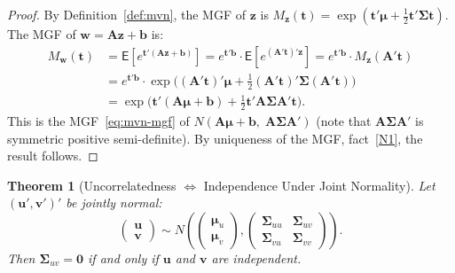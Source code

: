 \documentclass[14pt]{extarticle}
\theoremstyle{plain}
\newtheorem{theorem}{Theorem}[section]
\theoremstyle{definition}
\theoremstyle{remark}
\newcommand\expc{\mathsf{E}}
\newcommand{\bzero}{\mathbf{0}}
\newcommand{\bz}{\mathbf{z}}
\newcommand{\bw}{\mathbf{w}}
\newcommand{\bA}{\mathbf{A}}
\newcommand{\bv}{\mathbf{v}}
\newcommand{\bu}{\mathbf{u}}
\begin{document}
\begin{proof}
By Definition~\ref{def:mvn}, the MGF of $\bz$ is $M_{\bz}(\mathbf{t}) = \exp(\mathbf{t}'\boldsymbol\mu + \frac{1}{2}\mathbf{t}'\boldsymbol\Sigma\mathbf{t})$. The MGF of $\bw = \bA\bz + \mathbf{b}$ is:
\begin{align*}
M_{\bw}(\mathbf{t}) &= \expc\!\left[e^{\mathbf{t}'(\bA\bz + \mathbf{b})}\right] = e^{\mathbf{t}'\mathbf{b}} \cdot \expc\!\left[e^{(\bA'\mathbf{t})' \bz}\right] = e^{\mathbf{t}'\mathbf{b}} \cdot M_{\bz}(\bA'\mathbf{t})\\
&= e^{\mathbf{t}'\mathbf{b}} \cdot \exp\bigl((\bA'\mathbf{t})'\boldsymbol\mu + \tfrac{1}{2}(\bA'\mathbf{t})'\boldsymbol\Sigma(\bA'\mathbf{t})\bigr)\\
&= \exp\bigl(\mathbf{t}'(\bA\boldsymbol\mu + \mathbf{b}) + \tfrac{1}{2}\mathbf{t}'\bA\boldsymbol\Sigma\bA'\mathbf{t}\bigr).
\end{align*}
This is the MGF~\eqref{eq:mvn-mgf} of $N(\bA\boldsymbol\mu + \mathbf{b},\; \bA\boldsymbol\Sigma\bA')$ (note that $\bA\boldsymbol\Sigma\bA'$ is symmetric positive semi-definite). By uniqueness of the MGF, fact~\ref{N1}, the result follows.
\end{proof}

\begin{theorem}[Uncorrelatedness $\Leftrightarrow$ Independence Under Joint Normality]\label{thm:mvn-uncorr-indep}
Let $(\bu', \bv')'$ be jointly normal:
\[
\begin{pmatrix} \bu \\ \bv \end{pmatrix} \sim N\!\left(\begin{pmatrix} \boldsymbol\mu_u \\ \boldsymbol\mu_v \end{pmatrix}, \begin{pmatrix} \boldsymbol\Sigma_{uu} & \boldsymbol\Sigma_{uv} \\ \boldsymbol\Sigma_{vu} & \boldsymbol\Sigma_{vv} \end{pmatrix}\right).
\]
Then $\boldsymbol\Sigma_{uv} = \bzero$ if and only if $\bu$ and $\bv$ are independent.
\end{theorem}
\end{document}

